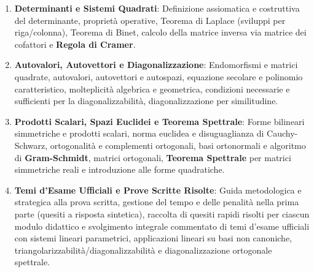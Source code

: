 \documentclass[11pt,a4paper,twoside,openright]{book}
\begin{document}
\begin{enumerate}[start=0]
    \item \textbf{Determinanti e Sistemi Quadrati}:
    Definizione assiomatica e costruttiva del determinante, proprietà operative, Teorema di Laplace (sviluppi per riga/colonna), Teorema di Binet, calcolo della matrice inversa via matrice dei cofattori e \textbf{Regola di Cramer}.

    \item \textbf{Autovalori, Autovettori e Diagonalizzazione}:
    Endomorfismi e matrici quadrate, autovalori, autovettori e autospazi, equazione secolare e polinomio caratteristico, molteplicità algebrica e geometrica, condizioni necessarie e sufficienti per la diagonalizzabilità, diagonalizzazione per similitudine.

    \item \textbf{Prodotti Scalari, Spazi Euclidei e Teorema Spettrale}:
    Forme bilineari simmetriche e prodotti scalari, norma euclidea e disuguaglianza di Cauchy-Schwarz, ortogonalità e complementi ortogonali, basi ortonormali e algoritmo di \textbf{Gram-Schmidt}, matrici ortogonali, \textbf{Teorema Spettrale} per matrici simmetriche reali e introduzione alle forme quadratiche.

    \item \textbf{Temi d'Esame Ufficiali e Prove Scritte Risolte}:
    Guida metodologica e strategica alla prova scritta, gestione del tempo e delle penalità nella prima parte (quesiti a risposta sintetica), raccolta di quesiti rapidi risolti per ciascun modulo didattico e svolgimento integrale commentato di temi d'esame ufficiali con sistemi lineari parametrici, applicazioni lineari su basi non canoniche, triangolarizzabilità/diagonalizzabilità e diagonalizzazione ortogonale spettrale.
\end{enumerate}

\cleardoublepage

\mainmatter










\end{document}
